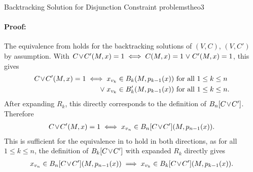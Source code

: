 \begin{theorem}{Backtracking Solution for Disjunction Constraint problems}{theo3}
    \paragraph*{Proof:}
    The equivalence from  holds for the backtracking
    solutions of $(V,C)$, $(V,C')$ by assumption.
    With $C\hspace{-0.5mm}\lor\hspace{-0.5mm}C'(M,x)=1\iff C(M,x)=1\mathrel\lor C'(M,x)=1$,
    this gives
    \begin{align*}
        C\hspace{-0.5mm}\lor\hspace{-0.5mm}C'(M,x)=1\iff{}&x_{v_k}\in B_k(M,p_{k-1}(x))\text{ for all }1\leq k\leq n\\
                                            \mathrel\lor{}&x_{v_k}\in B'_k(M,p_{k-1}(x))\text{ for all }1\leq k\leq n.
    \end{align*}
    After expanding $R_k$, this directly corresponds to the definition of
    $B_n[C\hspace{-0.5mm}\lor\hspace{-0.5mm}C']$.
    Therefore
    \begin{align*}
        C\hspace{-0.5mm}\lor\hspace{-0.5mm}C'(M,x)=1\iff{}x_{v_n}\in B_n[C\hspace{-0.5mm}\lor\hspace{-0.5mm}C'](M,p_{n-1}(x)).
    \end{align*}
    This is sufficient for the equivalence in  to hold
    in both directions, as for all $1\leq k\leq n$, the definition of
    $B_k[C\hspace{-0.5mm}\lor\hspace{-0.5mm}C']$ with expanded $R_k$ directly
    gives
    \begin{align*}
        x_{v_n}\in B_n[C\hspace{-0.5mm}\lor\hspace{-0.5mm}C'](M,p_{n-1}(x))\implies x_{v_k}\in B_k[C\hspace{-0.5mm}\lor\hspace{-0.5mm}C'](M,p_{k-1}(x)).
    \end{align*}
\end{theorem}
